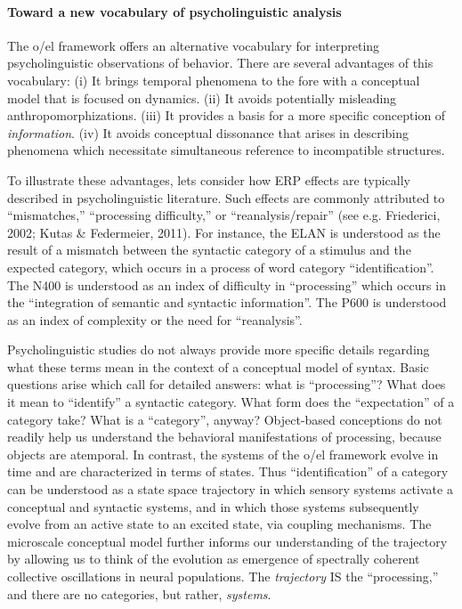 \paragraph{Toward a new vocabulary of psycholinguistic analysis}

The o/el framework offers an alternative vocabulary for interpreting psycholinguistic observations of behavior. There are several advantages of this vocabulary: (i) It brings temporal phenomena to the fore with a conceptual model that is focused on dynamics. (ii) It avoids potentially misleading anthropomorphizations. (iii) It provides a basis for a more specific conception of \textit{information}. (iv) It avoids conceptual dissonance that arises in describing phenomena which necessitate simultaneous reference to incompatible structures.

To illustrate these advantages, lets consider how ERP effects are typically described in psycholinguistic literature. Such effects are commonly attributed to “mismatches,” “processing difficulty,” or “reanalysis/repair” (see e.g. Friederici, 2002; Kutas \& Federmeier, 2011). For instance, the ELAN is understood as the result of a mismatch between the syntactic category of a stimulus and the expected category, which occurs in a process of word category “identification”. The N400 is understood as an index of difficulty in “processing” which occurs in the “integration of semantic and syntactic information”. The P600 is understood as an index of complexity or the need for “reanalysis”.

Psycholinguistic studies do not always provide more specific details regarding what these terms mean in the context of a conceptual model of syntax. Basic questions arise which call for detailed answers: what is “processing”? What does it mean to “identify” a syntactic category. What form does the “expectation” of a category take? What is a “category”, anyway? Object-based conceptions do not readily help us understand the behavioral manifestations of processing, because objects are atemporal. In contrast, the systems of the o/el framework evolve in time and are characterized in terms of states. Thus “identification” of a category can be understood as a state space trajectory in which sensory systems activate a conceptual and syntactic systems, and in which those systems subsequently evolve from an active state to an excited state, via coupling mechanisms. The microscale conceptual model further informs our understanding of the trajectory by allowing us to think of the evolution as emergence of spectrally coherent collective oscillations in neural populations. The \textit{trajectory} IS the “processing,” and there are no categories, but rather, \textit{systems}.

